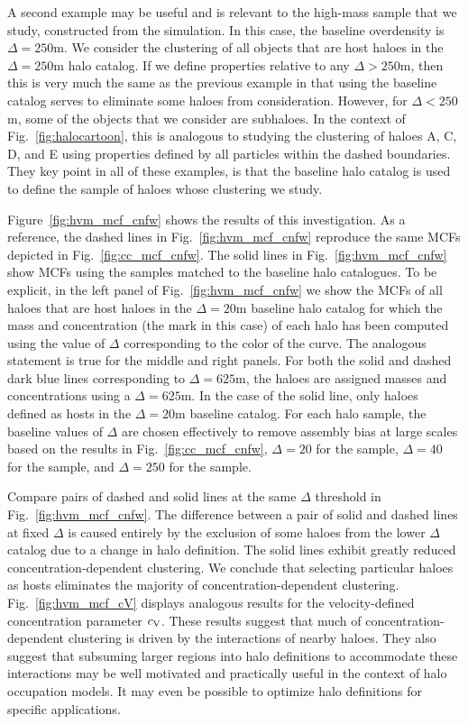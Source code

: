 \documentclass[usenatbib,fleqn]{mnras}
\begin{document}
A second example may be useful and is relevant to the high-mass sample that we study, constructed from the \simC{} simulation. In this case, the baseline overdensity is $\Delta=250$m. We consider the clustering of all objects that are host haloes in the $\Delta=250$m halo catalog. If we define properties relative to any $\Delta > 250$m, then this is very much the same as the previous example in that using the baseline catalog serves to eliminate some haloes from consideration. However, for $\Delta < 250$m, some of the objects that we consider are subhaloes. In the context of Fig.~\ref{fig:halocartoon}, this is analogous to studying the clustering of haloes A, C, D, and E using properties defined by all particles within the dashed boundaries. They key point in all of these examples, is that the baseline halo catalog is used to define the sample of haloes whose clustering we study.

Figure~\ref{fig:hvm_mcf_cnfw} shows the results of this investigation. As a reference, the dashed lines in Fig.~\ref{fig:hvm_mcf_cnfw} reproduce the same MCFs depicted in Fig.~\ref{fig:cc_mcf_cnfw}. The solid lines in Fig.~\ref{fig:hvm_mcf_cnfw} show MCFs using the samples matched to the baseline halo catalogues. To be explicit, in the left panel of Fig.~\ref{fig:hvm_mcf_cnfw} we show the MCFs of all haloes that are host haloes in the  $\Delta=20$m baseline halo catalog for which the mass and concentration (the mark in this case) of each halo has been computed using the value of $\Delta$ corresponding to the color of the curve. The analogous statement is true for the middle and right panels. For both the solid and dashed dark blue lines corresponding to $\Delta=625$m, the haloes are assigned masses and concentrations using a $\Delta=625$m. In the case of the solid line, only haloes defined as hosts in the $\Delta=20$m baseline catalog. For each halo sample, the baseline values of $\Delta$ are chosen effectively to remove assembly bias at large scales based on the results in Fig.~\ref{fig:cc_mcf_cnfw}, $\Delta=20$ for the \simA{} sample, $\Delta=40$ for the \simB{} sample, and $\Delta=250$ for the \simC{} sample. 

Compare pairs of dashed and solid lines at the same $\Delta$ threshold in Fig.~\ref{fig:hvm_mcf_cnfw}. The difference between a pair of solid and dashed lines at fixed $\Delta$ is caused entirely by the exclusion of some haloes from the lower $\Delta$ catalog due to a change in halo definition. The solid lines exhibit greatly reduced concentration-dependent clustering. We conclude that selecting particular haloes as hosts eliminates the majority of concentration-dependent clustering. Fig.~\ref{fig:hvm_mcf_cV} displays analogous results for the velocity-defined concentration parameter $c_{\rm V}$. These results suggest that much of concentration-dependent clustering is driven by the interactions of nearby haloes. They also suggest that subsuming larger regions into halo definitions to accommodate these interactions may be well motivated and practically useful in the context of halo occupation models. It may even be possible to optimize halo definitions for specific applications. 
\end{document}
